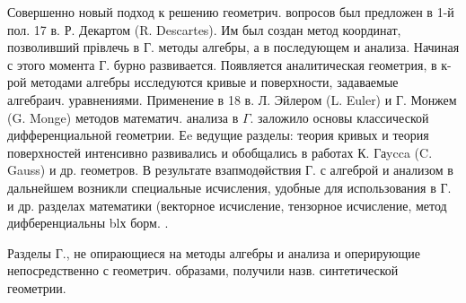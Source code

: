 \documentclass[10pt]{article}
\begin{document}
Совершенно новый подход $к$ решению геометрич. вопросов был предложен в 1-й пол. 17 в. Р. Декартом (R. Descartes). Им был создан метод координат, позволивший прівлечь в Г. методы алгебры, а в последующем и анализа. Начиная с этого момента Г. бурно развивается. Появляется аналитическая геометрия, в к-рой методами алгебры исследуются кривые и поверхности, задаваемые алгебраич. уравнениями. Применение в 18 в. Л. Эйлером (L. Euler) и Г. Монжем (G. Monge) методов математич. анализа в $\Gamma$. заложило основы классической дифференциальной геометрии. Еe ведущие разделы: теория кривых и теория поверхностей интенсивно развивались и обобщались в работах К. Гаycca (C. Gauss) и др. геометров. В результате взапмодөйствия Г. с алгеброй и анализом в дальнейшем возникли специальные исчисления, удобные для использования в Г. и др. разделах математики (векторное исчисление, тензорное исчисление, метод дифберенциальны blх борм. .



Разделы Г., не опирающиеся на методы алгебры и анализа и оперирующие непосредственно с геометрич. образами, получили назв. синтетической геометрии.
\end{document}
